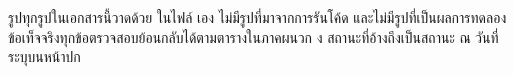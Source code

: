 \vfill
\begin{center}
\end{center}
{\sansall\footnotesize\color{muted}
รูปทุกรูปในเอกสารนี้วาดด้วย  ในไฟล์  เอง
ไม่มีรูปที่มาจากการรันโค้ด และไม่มีรูปที่เป็นผลการทดลอง \\
ข้อเท็จจริงทุกข้อตรวจสอบย้อนกลับได้ตามตารางในภาคผนวก ง
สถานะที่อ้างถึงเป็นสถานะ ณ วันที่ระบุบนหน้าปก \par}



